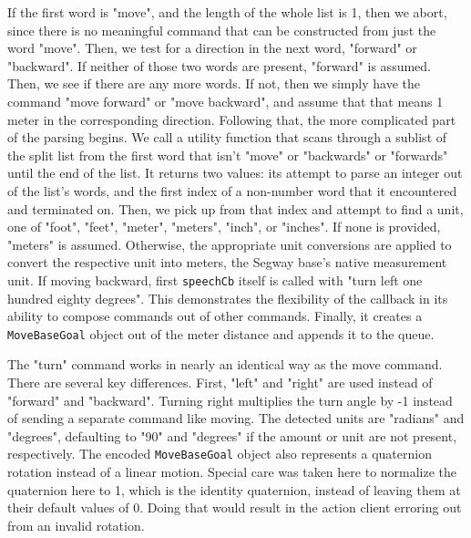 \documentclass{article}
\begin{document}
\noindent If the first word is "move", and the length of the whole list is 1, then we abort, since there is no meaningful command that can be constructed from just the word "move". Then, we test for a direction in the next word, "forward" or "backward". If neither of those two words are present, "forward" is assumed. Then, we see if there are any more words. If not, then we simply have the command "move forward" or "move backward", and assume that that means 1 meter in the corresponding direction. Following that, the more complicated part of the parsing begins. We call a utility function that scans through a sublist of the split list from the first word that isn't "move" or "backwards" or "forwards" until the end of the list. It returns two values: its attempt to parse an integer out of the list's words, and the first index of a non-number word that it encountered and terminated on.
Then, we pick up from that index and attempt to find a unit, one of "foot", "feet", "meter", "meters", "inch", or "inches". If none is provided, "meters" is assumed. Otherwise, the appropriate unit conversions are applied to convert the respective unit into meters, the Segway base's native measurement unit. If moving backward, first \texttt{speechCb} itself is called with "turn left one hundred eighty degrees". This demonstrates the flexibility of the callback in its ability to compose commands out of other commands. Finally, it creates a \texttt{MoveBaseGoal} object out of the meter distance and appends it to the queue. \par

\vspace{5mm}

\noindent The "turn" command works in nearly an identical way as the move command. There are several key differences. First, "left" and "right" are used instead of "forward" and "backward". Turning right multiplies the turn angle by -1 instead of sending a separate command like moving. The detected units are "radians" and "degrees", defaulting to "90" and "degrees" if the amount or unit are not present, respectively. The encoded \texttt{MoveBaseGoal} object also represents a quaternion rotation instead of a linear motion. Special care was taken here to normalize the quaternion here to 1, which is the identity quaternion, instead of leaving them at their default values of 0. Doing that would result in the action client erroring out from an invalid rotation.\par

\vspace{5mm}
\end{document}
